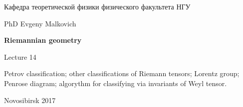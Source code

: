 \documentclass[12pt,pagesize,paper=landscape,paper=192mm:108mm]{scrbook}
\begin{document}
\begin{titlepage}
\begin{center}
    Кафедра теоретической физики физического факультета НГУ
    \medskip

    \Large
    PhD Evgeny Malkovich

    \huge
    \textbf{Riemannian geometry}
    \smallskip

    \Large
    Lecture 14
    \vfill

    \normalsize
    \begin{minipage}{0.6\linewidth}
      Petrov classification; other classifications of Riemann tensors;
      Lorentz group; Penrose diagram; algorythm for classifying via
      invariants of Weyl tensor.
    \end{minipage} 
    \vfill

    \normalsize \ccbysa\hspace{0.5em}  Novosibirsk 2017
  \end{center}
\end{titlepage}
\end{document}
